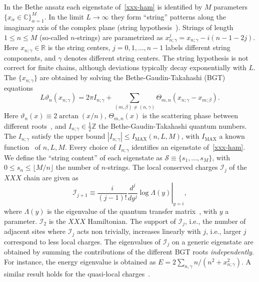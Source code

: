 \documentclass[twocolumn,superscriptaddress,prb,10pt]{revtex4-1}
\begin{document}
In the Bethe ansatz each eigenstate of~\eqref{xxx-ham} is identified 
by $M$ parameters  $\{x_\alpha\in\mathbb{C}\}_{\alpha=1}^M$. In the limit $L\to\infty$ they 
form ``string'' patterns along the imaginary axis of the complex 
plane (string hypothesis~\cite{bethe-1931,taka-book}). Strings of length $1\le n\le M$ 
(so-called $n$-strings) are parametrized as $x_{n;\gamma}^{j}=x_{n;\gamma}-i(n-1-2j)$. 
Here $x_{n;\gamma}\in\mathbb{R}$ is the string centers, $j=0,1,\dots,n-1$ 
labels different string components, and $\gamma$ denotes different string centers. The 
string hypothesis is not correct for finite chains, although deviations typically decay 
exponentially with $L$. The $\{x_{n;\gamma}\}$ are obtained by solving the 
Bethe-Gaudin-Takahashi (BGT) equations~\cite{takahashi-1971,taka-book} 
%
\begin{equation}
L\vartheta_n(x_{n;\gamma})=2\pi I_{n;\gamma}+\sum\limits_{(m,\beta)
\ne(n,\gamma)}\Theta_{m,n}(x_{n;\gamma}-x_{m;\beta}).
\label{bt-eq}
\end{equation}
%
Here $\vartheta_n(x)\equiv2\arctan(x/n)$, $\Theta_{m,n}(x)$ is the scattering 
phase between different roots~\cite{taka-book}, and $I_{n;\gamma}\in\frac{1}{2}\mathbb{Z}$ 
the Bethe-Gaudin-Takahashi quantum numbers. The $I_{n;\gamma}$ satisfy the upper 
bound $|I_{n;\gamma}|\le I_{\textrm{MAX}}(n,L,M)$, with $I_{\textrm{MAX}}$ a known 
function~\cite{taka-book} of $n,L,M$. 
Every choice of $I_{n;\gamma}$ identifies an eigenstate of~\eqref{xxx-ham}. 
We define the ``string content'' of each eigenstate as ${\mathcal S}\equiv\{s_1,\dots,
s_M\}$, with $0\le s_n\le \lfloor M/n\rfloor$ the number of $n$-strings.  
The local conserved charges ${\mathcal I}_j$ of the $XXX$ chain are given as   
%
\begin{equation}
\label{I-def}
\left.{\mathcal I}_{j+1}\equiv\frac{i}{(j-1)!}\frac{d^j}{dy^j}\log\Lambda
(y)\right|_{y=i}, 
\end{equation}
%
where $\Lambda(y)$ is the eigenvalue of the quantum transfer matrix~\cite{kor-book}, 
with $y$ a parameter. ${\mathcal I}_2$ is the $XXX$ Hamiltonian. 
The support of ${\mathcal I}_j$, i.e., the number of 
adjacent sites where ${\mathcal I}_j$ acts non trivially, increases linearly with $j$, i.e., 
larger $j$ correspond to less local charges.  
The eigenvalues of ${\mathcal I}_j$ on a generic eigenstate are 
obtained by summing the contributions of the different BGT roots {\it independently}. 
For instance, the energy eigenvalue is obtained as $E=2\sum_{n,\gamma} n/(n^2+x^2_{n;\gamma})$. 
A similar result holds for the quasi-local charges~\cite{ilievski-2015a}. 
\end{document}
